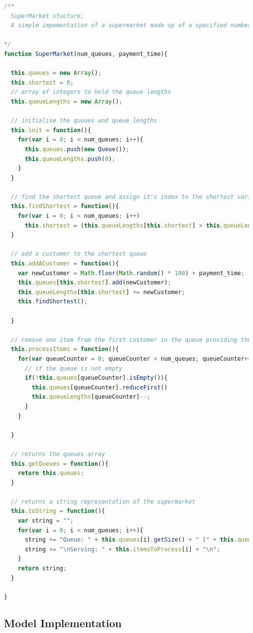 \documentclass[pdftex,a4paper,10pt,titlepage]{article}
\begin{document}
\begin{lstlisting}[language=JavaScript]
/**
  SuperMarket stucture,
  A simple impementation of a supermarket made up of a specified number of queues

*/
function SuperMarket(num_queues, payment_time){

  this.queues = new Array();
  this.shortest = 0;
  // array of integers to hold the queue lengths
  this.queueLengths = new Array();

  // initialise the queues and queue lengths
  this.init = function(){
    for(var i = 0; i < num_queues; i++){
      this.queues.push(new Queue());
      this.queueLengths.push(0);
    }
  }
  
  // find the shortest queue and assign it's index to the shortest variable
  this.findShortest = function(){
    for(var i = 0; i < num_queues; i++)
      this.shortest = (this.queueLengths[this.shortest] > this.queueLengths[i]) ? i : this.shortest;
  }
  
  // add a customer to the shortest queue
  this.addACustomer = function(){
    var newCustomer = Math.floor(Math.random() * 100) + payment_time;
    this.queues[this.shortest].add(newCustomer);
    this.queueLengths[this.shortest] += newCustomer;
    this.findShortest();

  }
  
  // remove one item from the first customer in the queue providing the queue is not empty
  this.processItems = function(){
    for(var queueCounter = 0; queueCounter < num_queues; queueCounter++){
      // if the queue is not empty
      if(!this.queues[queueCounter].isEmpty()){
        this.queues[queueCounter].reduceFirst()
        this.queueLengths[queueCounter]--;
      }
    }

  }

  // returns the queues array
  this.getQueues = function(){
    return this.queues;
  }

  // returns a string representation of the supermarket
  this.toString = function(){
    var string = "";
    for(var i = 0; i < num_queues; i++){
      string += "Queue: " + this.queues[i].getSize() + " [" + this.queueLengths[i] + "] ";
      string += "\nServing: " + this.itemsToProcess[i] + "\n";
    }
    return string;
  }
  
}
\end{lstlisting}
\pagebreak
\subsection{Model Implementation}
\end{document}
